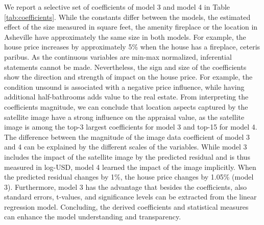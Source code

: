 \documentclass[letterpaper]{article}
\begin{document}
We report a selective set of coefficients of model 3 and model 4 in Table \ref{tab:coefficients}. While the constants differ between the models, the estimated effect of the size measured in square feet, the amenity fireplace or the location in Asheville have approximately the same size in both models. For example, the house price increases by approximately 5\% when the house has a fireplace, ceteris paribus. As the continuous variables are min-max normalized, inferential statements cannot be made. Nevertheless, the sign and size of the coefficients show the direction and strength of impact on the house price. For example, the condition unsound is associated with a negative price influence, while having additional half-bathrooms adds value to the real estate. From interpreting the coefficients magnitude, we can conclude that location aspects captured by the satellite image have a strong influence on the appraisal value, as the satellite image is among the top-3 largest coefficients for model 3 and top-15 for model 4. The difference between the magnitude of the image data coefficient of model 3 and 4 can be explained by the different scales of the variables. While model 3 includes the impact of the satellite image by the predicted residual and is thus measured in log-USD, model 4 learned the impact of the image implicitly. When the predicted residual changes by 1\%, the house price changes by 1.05\% (model 3). Furthermore, model 3 has the advantage that besides the coefficients, also standard errors, t-values, and significance levels can be extracted from the linear regression model. Concluding, the derived coefficients and statistical measures can enhance the model understanding and transparency.
\end{document}
